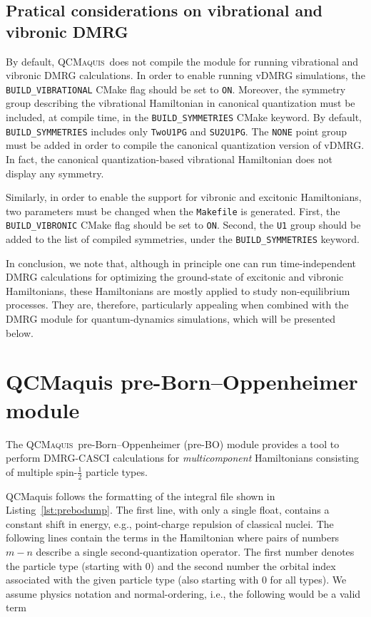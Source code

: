 \documentclass[bibliography=totoc,12pt,a4paper]{scrartcl}
\newcommand{\qcm}{\textsc{QCMaquis}}
\begin{document}
\subsection{Pratical considerations on vibrational and vibronic DMRG}
\label{sec:Practical-vDMRG}

By default, \qcm\ does not compile the module for running vibrational and vibronic DMRG calculations.
In order to enable running vDMRG simulations, the \texttt{BUILD\_VIBRATIONAL} CMake flag should be set to \texttt{ON}.
Moreover, the symmetry group describing the vibrational Hamiltonian in canonical quantization must be included, at compile time, in the \texttt{BUILD\_SYMMETRIES} CMake keyword.
By default, \texttt{BUILD\_SYMMETRIES} includes only \texttt{TwoU1PG} and \texttt{SU2U1PG}.
The \texttt{NONE} point group must be added in order to compile the canonical quantization version of vDMRG.
In fact, the canonical quantization-based vibrational Hamiltonian does not display any symmetry.

Similarly, in order to enable the support for vibronic and excitonic Hamiltonians, two parameters must be changed when the \texttt{Makefile} is generated.
First, the \texttt{BUILD\_VIBRONIC} CMake flag should be set to \texttt{ON}.
Second, the \texttt{U1} group should be added to the list of compiled symmetries, under the \texttt{BUILD\_SYMMETRIES} keyword.

In conclusion, we note that, although in principle one can run time-independent DMRG calculations for optimizing the ground-state of excitonic and vibronic Hamiltonians, these Hamiltonians are mostly applied to study non-equilibrium processes.
They are, therefore, particularly appealing when combined with the DMRG module for quantum-dynamics simulations, which will be presented below.

\section{QCMaquis pre-Born--Oppenheimer module}
\label{sec:preBO}

The \qcm\ pre-Born--Oppenheimer (pre-BO) module provides a tool to perform DMRG-CASCI calculations for \textit{multicomponent} Hamiltonians consisting of multiple spin-$\frac12$ particle types.

QCMaquis follows the formatting of the integral file shown in Listing~\ref{lst:prebodump}.
The first line, with only a single float, contains a constant shift in energy, e.g., point-charge repulsion of classical nuclei.
The following lines contain the terms in the Hamiltonian where pairs of numbers $m-n$ describe a single second-quantization operator.
The first number denotes the particle type (starting with 0) and the second number the orbital index associated with the given particle type (also starting with 0 for all types).
We assume physics notation and normal-ordering, i.e., the following would be a valid term
\end{document}
